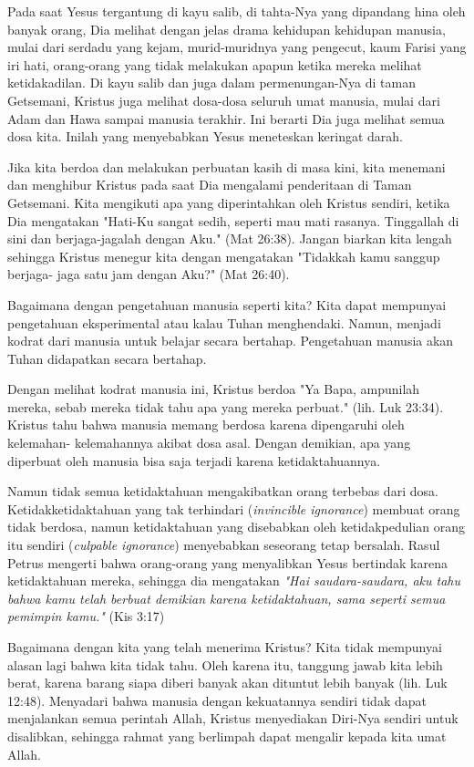 Pada saat Yesus tergantung di kayu salib, di tahta-Nya yang dipandang hina oleh
banyak orang, Dia melihat dengan jelas drama kehidupan kehidupan manusia, mulai
dari serdadu yang kejam, murid-muridnya yang pengecut, kaum Farisi yang iri
hati, orang-orang yang tidak melakukan apapun ketika mereka melihat
ketidakadilan. Di kayu salib dan juga dalam permenungan-Nya di taman Getsemani,
Kristus juga melihat dosa-dosa seluruh umat manusia, mulai dari Adam dan Hawa
sampai manusia terakhir. Ini berarti Dia juga melihat semua dosa kita. Inilah
yang menyebabkan Yesus meneteskan keringat darah.

Jika kita berdoa dan melakukan perbuatan kasih di masa kini, kita
menemani dan menghibur Kristus pada saat Dia mengalami penderitaan di Taman
Getsemani. Kita mengikuti apa yang diperintahkan oleh Kristus sendiri, ketika
Dia mengatakan "Hati-Ku sangat sedih, seperti mau mati rasanya. Tinggallah di
sini dan berjaga-jagalah dengan Aku." (Mat 26:38). Jangan biarkan kita lengah
sehingga Kristus menegur kita dengan mengatakan "Tidakkah kamu sanggup berjaga-
jaga satu jam dengan Aku?" (Mat 26:40).

Bagaimana dengan pengetahuan manusia seperti kita? Kita dapat mempunyai
pengetahuan eksperimental atau kalau Tuhan menghendaki. Namun, menjadi
kodrat dari manusia untuk belajar secara bertahap. Pengetahuan manusia akan
Tuhan didapatkan secara bertahap. 

Dengan melihat kodrat manusia ini, Kristus berdoa "Ya Bapa, ampunilah mereka,
sebab mereka tidak tahu apa yang mereka perbuat." (lih. Luk 23:34). Kristus
tahu bahwa manusia memang berdosa karena dipengaruhi oleh kelemahan-
kelemahannya akibat dosa asal. Dengan demikian, apa yang diperbuat oleh manusia
bisa saja terjadi karena ketidaktahuannya. 

Namun tidak semua ketidaktahuan
mengakibatkan orang terbebas dari dosa. Ketidakketidaktahuan yang tak
terhindari (\textit{invincible ignorance}) membuat orang tidak berdosa, namun
ketidaktahuan yang disebabkan oleh ketidakpedulian orang itu sendiri (\textit{culpable
ignorance}) menyebabkan seseorang tetap bersalah. Rasul Petrus mengerti bahwa
orang-orang yang menyalibkan Yesus bertindak karena ketidaktahuan mereka,
sehingga dia mengatakan \textit{"Hai saudara-saudara, aku tahu bahwa kamu telah berbuat
demikian karena ketidaktahuan, sama seperti semua pemimpin kamu."} (Kis 3:17)

Bagaimana dengan kita yang telah menerima Kristus? Kita tidak mempunyai alasan
lagi bahwa kita tidak tahu. Oleh karena itu, tanggung jawab kita lebih berat,
karena barang siapa diberi banyak akan dituntut lebih banyak (lih. Luk 12:48).
Menyadari bahwa manusia dengan kekuatannya sendiri tidak dapat menjalankan
semua perintah Allah, Kristus menyediakan Diri-Nya sendiri untuk disalibkan,
sehingga rahmat yang berlimpah dapat mengalir kepada kita umat Allah. 

